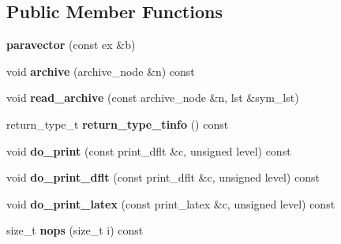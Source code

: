 \subsection*{Public Member Functions}
\begin{DoxyCompactItemize}
\item 
\mbox{\label{class_moeb_inv_1_1paravector_a9da910ab200b81161d50a6ab40067572}} 
{\bfseries paravector} (const ex \&b)
\item 
\mbox{\label{class_moeb_inv_1_1paravector_a7d9d24c6777afead4c762c68640869aa}} 
void {\bfseries archive} (archive\+\_\+node \&n) const
\item 
\mbox{\label{class_moeb_inv_1_1paravector_acf4bf91213a25edb147df9ecfc4ad0a8}} 
void {\bfseries read\+\_\+archive} (const archive\+\_\+node \&n, lst \&sym\+\_\+lst)
\item 
\mbox{\label{class_moeb_inv_1_1paravector_a1cbe8eb73a9ce64fe4228173dfacd21d}} 
return\+\_\+type\+\_\+t {\bfseries return\+\_\+type\+\_\+tinfo} () const
\item 
\mbox{\label{class_moeb_inv_1_1paravector_a5db3f531815d5c66305ea93cae484cd8}} 
void {\bfseries do\+\_\+print} (const print\+\_\+dflt \&c, unsigned level) const
\item 
\mbox{\label{class_moeb_inv_1_1paravector_a324b951f813225e89ca36884309e322e}} 
void {\bfseries do\+\_\+print\+\_\+dflt} (const print\+\_\+dflt \&c, unsigned level) const
\item 
\mbox{\label{class_moeb_inv_1_1paravector_a78cb1eb0f441e51c389825c3f89ffa79}} 
void {\bfseries do\+\_\+print\+\_\+latex} (const print\+\_\+latex \&c, unsigned level) const
\item 
\mbox{\label{class_moeb_inv_1_1paravector_a3410467f4885f915ff8d0da7ae0564ee}} 
size\+\_\+t {\bfseries nops} (size\+\_\+t i) const
\item 
\mbox{\label{class_moeb_inv_1_1paravector_a57c171c48638d93646d331f35390ddb4}} 

\end{DoxyCompactItemize}
